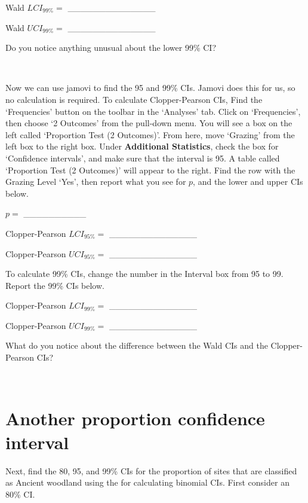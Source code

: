 \documentclass[
  openany]{krantz}
\begin{document}
Wald \(LCI_{99\%} =\) \_\_\_\_\_\_\_\_\_\_\_\_\_\_

Wald \(UCI_{99\%} =\) \_\_\_\_\_\_\_\_\_\_\_\_\_\_

Do you notice anything unusual about the lower 99\% CI?

\begin{verbatim}


\end{verbatim}

Now we can use jamovi to find the  95 and 99\% CIs.
Jamovi does this for us, so no calculation is required.
To calculate Clopper-Pearson CIs, Find the `Frequencies' button on the toolbar in the `Analyses' tab.
Click on `Frequencies', then choose `2 Outcomes' from the pull-down menu.
You will see a box on the left called `Proportion Test (2 Outcomes)'.
From here, move `Grazing' from the left box to the right box.
Under \textbf{Additional Statistics}, check the box for `Confidence intervals', and make sure that the interval is 95.
A table called `Proportion Test (2 Outcomes)' will appear to the right.
Find the row with the Grazing Level `Yes', then report what you see for \(p\), and the lower and upper CIs below.

\(p =\) \_\_\_\_\_\_\_\_\_\_

Clopper-Pearson \(LCI_{95\%} =\) \_\_\_\_\_\_\_\_\_\_\_\_\_\_

Clopper-Pearson \(UCI_{95\%} =\) \_\_\_\_\_\_\_\_\_\_\_\_\_\_

To calculate 99\% CIs, change the number in the Interval box from 95 to 99.
Report the 99\% CIs below.

Clopper-Pearson \(LCI_{99\%} =\) \_\_\_\_\_\_\_\_\_\_\_\_\_\_

Clopper-Pearson \(UCI_{99\%} =\) \_\_\_\_\_\_\_\_\_\_\_\_\_\_

What do you notice about the difference between the Wald CIs and the Clopper-Pearson CIs?

\begin{verbatim}


\end{verbatim}

\hypertarget{another-proportion-confidence-interval}{%
\section{Another proportion confidence interval}\label{another-proportion-confidence-interval}}

Next, find the 80, 95, and 99\% CIs for the proportion of sites that are classified as Ancient woodland using the  for calculating binomial CIs.
First consider an 80\% CI.
\end{document}
